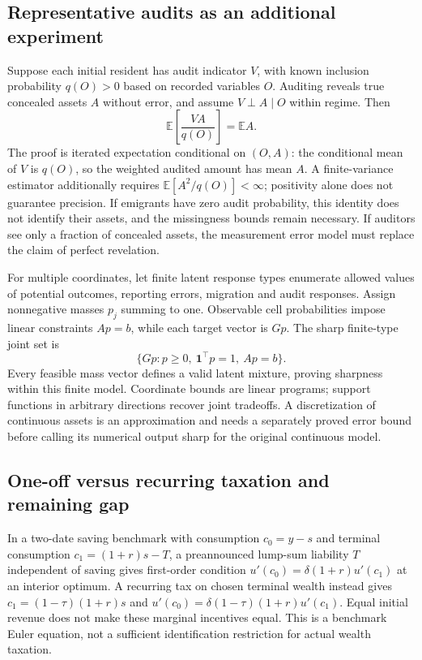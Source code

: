 \documentclass[11pt]{article}
\newcommand{\E}{\mathbb E}
\begin{document}
\subsection*{Representative audits as an additional experiment}
Suppose each initial resident has audit indicator $V$, with known
inclusion probability $q(O)>0$ based on recorded variables $O$. Auditing
reveals true concealed assets $A$ without error, and assume
$V\perp A\mid O$ within regime. Then
\[
 \E\left[\frac{VA}{q(O)}\right]=\E A.
\]
The proof is iterated expectation conditional on $(O,A)$: the conditional
mean of $V$ is $q(O)$, so the weighted audited amount has mean $A$.
A finite-variance estimator additionally requires
$\E[A^2/q(O)]<\infty$; positivity alone does not guarantee precision.
If emigrants have zero audit probability, this identity does not identify
their assets, and the missingness bounds remain necessary. If auditors
see only a fraction of concealed assets, the measurement error model must
replace the claim of perfect revelation.

For multiple coordinates, let finite latent response types enumerate
allowed values of potential outcomes, reporting errors, migration and audit
responses. Assign nonnegative masses $p_j$ summing to one. Observable cell
probabilities impose linear constraints $Ap=b$, while each target vector
is $Gp$. The sharp finite-type joint set is
\[
 \{Gp:p\geq0,\ \mathbf1^\top p=1,\ Ap=b\}.
\]
Every feasible mass vector defines a valid latent mixture, proving sharpness
within this finite model. Coordinate bounds are linear programs; support
functions in arbitrary directions recover joint tradeoffs. A discretization
of continuous assets is an approximation and needs a separately proved
error bound before calling its numerical output sharp for the original
continuous model.

\subsection*{One-off versus recurring taxation and remaining gap}
In a two-date saving benchmark with consumption $c_0=y-s$ and terminal
consumption $c_1=(1+r)s-T$, a preannounced lump-sum liability $T$ independent
of saving gives first-order condition
$u'(c_0)=\delta(1+r)u'(c_1)$ at an interior optimum. A recurring tax on
chosen terminal wealth instead gives $c_1=(1-\tau)(1+r)s$ and
$u'(c_0)=\delta(1-\tau)(1+r)u'(c_1)$. Equal initial revenue does not make
these marginal incentives equal. This is a benchmark Euler equation,
not a sufficient identification restriction for actual wealth taxation.
\end{document}
